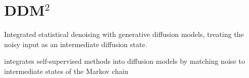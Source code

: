 \chapter{DDM$^2$}


Integrated statistical denoising with generative diffusion models, treating the noisy input as an intermediate diffusion state.

integrates self-supervised methods into diffusion models by matching noise to intermediate states of the Markov chain
